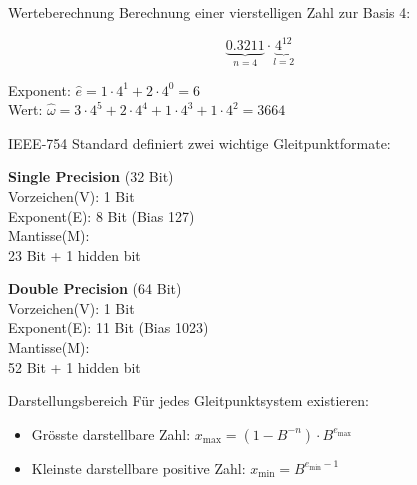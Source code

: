 \begin{example2}{Werteberechnung} Berechnung einer vierstelligen Zahl zur Basis 4:
    \vspace{-2mm}\\
    \begin{minipage}{0.3\textwidth}
        $$\underbrace{0.3211}_{n=4} \cdot \underbrace{4^{12}}_{l=2}$$
    \end{minipage}
    \begin{minipage}[t]{0.65\textwidth}
        Exponent: $\hat{e} = 1 \cdot 4^1 + 2 \cdot 4^0 = 6$ \vspace{1mm}\\
        Wert: $\hat{\omega} = 3 \cdot 4^5 + 2 \cdot 4^4 + 1 \cdot 4^3 + 1 \cdot 4^2 = 3664$
    \end{minipage}
\end{example2}



\begin{concept}{IEEE-754 Standard} definiert zwei wichtige Gleitpunktformate:
\vspace{1mm}\\
\begin{minipage}[t]{0.5\textwidth}
    \textbf{Single Precision} (32 Bit)\\
    Vorzeichen(V): 1 Bit\\
    Exponent(E): 8 Bit (Bias 127)\\
    Mantisse(M): \\ 23 Bit + 1 hidden bit
\end{minipage}
\begin{minipage}[t]{0.48\textwidth}
    \textbf{Double Precision} (64 Bit)\\
    Vorzeichen(V): 1 Bit\\
    Exponent(E): 11 Bit (Bias 1023)\\
    Mantisse(M): \\ 52 Bit + 1 hidden bit
\end{minipage}
\end{concept}

\begin{theorem}{Darstellungsbereich}
Für jedes Gleitpunktsystem existieren:
\begin{itemize}
    \item Grösste darstellbare Zahl: \large{$x_{\text{max}} = (1-B^{-n}) \cdot B^{e_{\text{max}}}$}
    \item \normalsize{Kleinste darstellbare positive Zahl:} \large{$x_{\text{min}} = B^{e_{\text{min}}-1}$}
\end{itemize}
\end{theorem}

